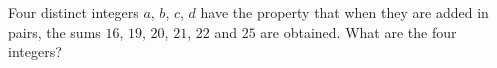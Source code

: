 Four distinct integers $a$, $b$, $c$, $d$ have the property that when they are added in pairs, the sums $16$, $19$, $20$, $21$, $22$ and $25$ are obtained. What are the four integers?
